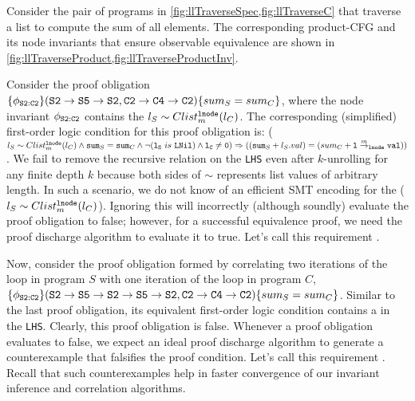 Consider the pair of programs in \cref{fig:llTraverseSpec,fig:llTraverseC}
that traverse a list to compute the sum of all elements.
The corresponding product-CFG and its node
invariants that ensure observable
equivalence are shown in \cref{fig:llTraverseProduct,fig:llTraverseProductInv}.

Consider
the proof obligation $\{\phi_{{\tt S2:C2}}\} ({\tt S2\rightarrow S5\rightarrow S2}, {\tt C2\rightarrow C4\rightarrow C2}) \{sum_{S} = sum_{C}\}$, where
the node invariant $\phi_{{\tt S2:C2}}$ contains
the \recursiveRelation{} $l_{S}\sim{}Clist^{{\tt lnode}}_{m}(l_{C})$.
The corresponding (simplified) first-order logic condition for this
proof obligation is:
($l_{S}\sim{}Clist^{{\tt lnode}}_{m}(l_{C}) \land {\tt sum}_S={\tt sum}_C \land \neg({\tt l_S}\ is\ {\tt LNil}) \land {\tt l_C\neq0}) \Rightarrow (({\tt sum}_S + l_S.val) = (sum_C + {\tt l} \overset{m}{\rightarrow}_{{\tt lnode}} {\tt val}))$.
We fail to remove the recursive relation on the {\tt LHS} even after
$k$-unrolling for any finite depth $k$ because both sides of $\sim$
represents list values of arbitrary length.
In such a scenario, we do not know of an efficient
SMT encoding for the \recursiveRelation{} ($l_{S}\sim{}Clist^{{\tt lnode}}_{m}(l_{C})$).
Ignoring this \recursiveRelation{} will incorrectly (although soundly) evaluate
the proof obligation to false; however, for a successful equivalence
proof, we need
the proof discharge algorithm to evaluate it to true. Let's call this
requirement .

Now, consider the proof obligation formed by correlating two iterations
of the loop in program $S$ with one iteration of the loop in program $C$,
$\{\phi_{{\tt S2:C2}}\} ({\tt S2\rightarrow S5\rightarrow S2\rightarrow S5\rightarrow S2}, {\tt C2\rightarrow C4\rightarrow C2}) \{sum_{S} = sum_{C}\}$.
Similar to the last proof obligation, its equivalent first-order logic condition contains a \recursiveRelation{} in the {\tt LHS}.
Clearly, this proof obligation is false.
Whenever a proof
obligation evaluates to false, we
expect an ideal proof discharge algorithm to generate a
counterexample that falsifies the proof condition.
Let's call this
requirement .
Recall that such counterexamples help in faster
convergence of our invariant inference and correlation algorithms.

